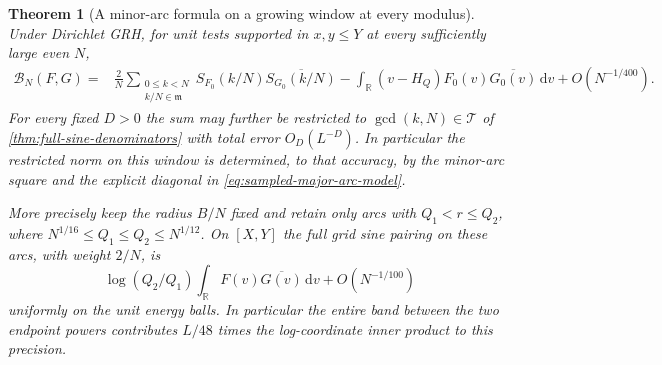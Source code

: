 \documentclass[11pt,a4paper]{article}
\numberwithin{equation}{section}
\newtheorem{theorem}{Theorem}[section]
\newcommand{\ud}{\mathrm d}
\newcommand{\B}{\mathcal B_N}
\begin{document}
\begin{theorem}[A minor-arc formula on a growing window at every modulus]
\label{thm:sampled-major-arc-model}
Under Dirichlet GRH, for unit tests supported in $x,y\le Y$
at every sufficiently large even $N$,
\begin{align}
 \B(F,G)={}&\frac2N\sum_{\substack{0\le k<N\\k/N\in\mathfrak m}}
       S_{F_0}(k/N)\overline{S_{G_0}(k/N)}
 -\int_{\mathbb R}(v-H_Q)F_0(v)\overline{G_0(v)}\,\ud v
 +O(N^{-1/400}).
 \label{eq:sampled-major-arc-model}
\end{align}
For every fixed $D>0$ the sum may further be restricted to
$\gcd(k,N)\in\mathcal T$ of \cref{thm:full-sine-denominators}
with total error $O_D(L^{-D})$. In particular the restricted norm
on this window is determined, to that accuracy, by the minor-arc
square and the explicit diagonal in \eqref{eq:sampled-major-arc-model}.

More precisely keep the radius $B/N$ fixed and retain only arcs
with $Q_1<r\le Q_2$, where $N^{1/16}\le Q_1\le Q_2\le N^{1/12}$.
On $[X,Y]$ the full grid sine pairing on these arcs, with weight
$2/N$, is
\begin{equation}
 \log(Q_2/Q_1)\int_{\mathbb R}F(v)\overline{G(v)}\,\ud v
                  +O(N^{-1/100})
 \label{eq:sampled-arc-shell}
\end{equation}
uniformly on the unit energy balls. In particular the entire band
between the two endpoint powers contributes $L/48$ times the
log-coordinate inner product to this precision.
\end{theorem}
\end{document}
